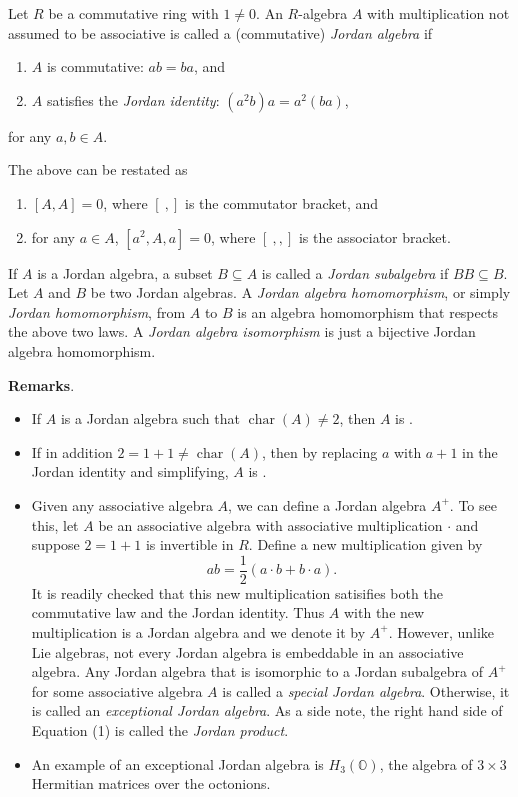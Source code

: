 \documentclass[12pt]{article}
\begin{document}

Let $R$ be a commutative ring with $1\neq 0$.  An $R$-algebra $A$ with multiplication not assumed to be associative is called a (commutative) \emph{Jordan algebra} if
\begin{enumerate}
\item $A$ is commutative: $ab=ba$, and
\item $A$ satisfies the \emph{Jordan identity}: $(a^2b)a=a^2(ba)$,
\end{enumerate}
for any $a,b\in A$.

The above can be restated as 
\begin{enumerate}
\item $[A,A]=0$, where $[\ , ]$ is the commutator bracket, and 
\item for any $a\in A$, $[a^2,A,a]=0$, where $[\ , , ]$ is the associator bracket.
\end{enumerate}
If $A$ is a Jordan algebra, a subset $B\subseteq A$ is called a \emph{Jordan subalgebra} if $BB\subseteq B$.  Let $A$ and $B$ be two Jordan algebras.  A \emph{Jordan algebra homomorphism}, or simply \emph{Jordan homomorphism}, from $A$ to $B$ is an algebra homomorphism that respects the above two laws.  A \emph{Jordan algebra isomorphism} is just a bijective Jordan algebra homomorphism.

\textbf{Remarks}.
\begin{itemize}
\item If $A$ is a Jordan algebra such that $\operatorname{char}(A)\neq2$, then $A$ is .
\item If in addition $2=1+1\neq\operatorname{char}(A)$, then by replacing $a$ with $a+1$ in the Jordan identity and simplifying, $A$ is .
\item Given any associative algebra $A$, we can define a Jordan algebra $A^{+}$.  To see this, let $A$ be an associative algebra with associative multiplication $\cdot$ and suppose $2=1+1$ is invertible in $R$.  Define a new multiplication given by 
\begin{equation}
ab=\frac{1}{2}(a\cdot b+b\cdot a).
\end{equation}
It is readily checked that this new multiplication satisifies both the commutative law and the Jordan identity.  Thus $A$ with the new multiplication is a Jordan algebra and we denote it by $A^{+}$.  However, unlike Lie algebras, not every Jordan algebra is embeddable in an associative algebra.  Any Jordan algebra that is isomorphic to a Jordan subalgebra of $A^{+}$ for some associative algebra $A$ is called a \emph{special Jordan algebra}.  Otherwise, it is called an \emph{exceptional Jordan algebra}.  As a side note, the right hand side of Equation (1) is called the \emph{Jordan product}.
\item An example of an exceptional Jordan algebra is $H_3(\mathbb{O})$, the algebra of $3\times3$ Hermitian matrices over the octonions.
\end{itemize}
\end{document}
